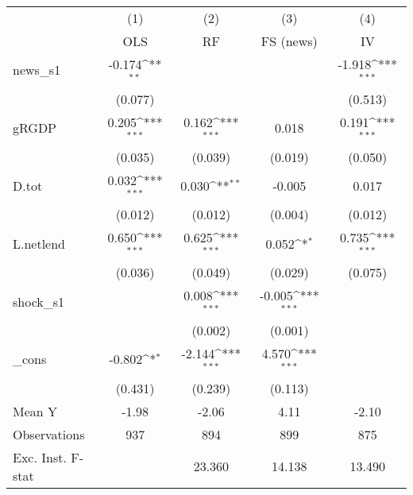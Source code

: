 {
\def\sym#1{\ifmmode^{#1}\else\(^{#1}\)\fi}
\begin{tabular}{l*{4}{c}}
\toprule
            &\multicolumn{1}{c}{(1)}&\multicolumn{1}{c}{(2)}&\multicolumn{1}{c}{(3)}&\multicolumn{1}{c}{(4)}\\
            &\multicolumn{1}{c}{OLS}&\multicolumn{1}{c}{RF}&\multicolumn{1}{c}{FS (news)}&\multicolumn{1}{c}{IV}\\
\midrule
news\_s1     &      -0.174\sym{**} &                     &                     &      -1.918\sym{***}\\
            &     (0.077)         &                     &                     &     (0.513)         \\
\addlinespace
gRGDP       &       0.205\sym{***}&       0.162\sym{***}&       0.018         &       0.191\sym{***}\\
            &     (0.035)         &     (0.039)         &     (0.019)         &     (0.050)         \\
\addlinespace
D.tot       &       0.032\sym{***}&       0.030\sym{**} &      -0.005         &       0.017         \\
            &     (0.012)         &     (0.012)         &     (0.004)         &     (0.012)         \\
\addlinespace
L.netlend   &       0.650\sym{***}&       0.625\sym{***}&       0.052\sym{*}  &       0.735\sym{***}\\
            &     (0.036)         &     (0.049)         &     (0.029)         &     (0.075)         \\
\addlinespace
shock\_s1    &                     &       0.008\sym{***}&      -0.005\sym{***}&                     \\
            &                     &     (0.002)         &     (0.001)         &                     \\
\addlinespace
\_cons      &      -0.802\sym{*}  &      -2.144\sym{***}&       4.570\sym{***}&                     \\
            &     (0.431)         &     (0.239)         &     (0.113)         &                     \\
\midrule
Mean Y      &       -1.98         &       -2.06         &        4.11         &       -2.10         \\
Observations&         937         &         894         &         899         &         875         \\
Exc. Inst. F-stat&                     &      23.360         &      14.138         &      13.490         \\
\bottomrule
\end{tabular}
}
